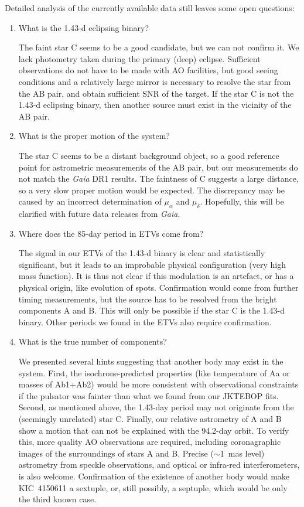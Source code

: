 \documentclass{aa}
\begin{document}
Detailed analysis of the currently available data still leaves some open questions:
\begin{enumerate}
\item What is the 1.43-d eclipsing binary?

The faint star C seems to be a good candidate, but we can not confirm it. We lack 
photometry taken during the primary (deep) eclipse. Sufficient observations do not 
have to be made with AO facilities, but good seeing conditions and a relatively large
mirror is necessary to resolve the star from the AB pair, and obtain sufficient 
SNR of the target. If the star C is not the 1.43-d eclipsing binary, then another 
source must exist in the vicinity of the AB pair.

\item What is the proper motion of the system?

The star C seems to be a distant background object, so a good reference point for 
astrometric measurements of the AB pair, but our measurements do not match the
{\it Gaia} DR1 results. The faintness of C suggests a large distance, so a very
slow proper motion would be expected. The discrepancy may be caused by an 
incorrect determination of $\mu_\alpha$ and $\mu_\delta$. Hopefully, this will
be clarified with future data releases from {\it Gaia}.

\item Where does the 85-day period in ETVs come from?

The signal in our ETVs of the 1.43-d binary is clear and statistically significant,
but it leads to an improbable physical configuration (very high mass function). 
It is thus not clear if this modulation is an artefact, or has a physical origin, like
evolution of spots. Confirmation would come from further timing measurements, but the
source has to be resolved from the bright components A and B. This will only be possible
if the star C is the 1.43-d binary. Other periods we found in the ETVs also require 
confirmation.

\item What is the true number of components?

We presented several hints suggesting that another body may exist in the system. 
First, the isochrone-predicted properties (like temperature of Aa or masses of 
Ab1+Ab2) would be more consistent with observational constraints if the 
pulsator was fainter than what we found from our JKTEBOP fits. Second, as mentioned 
above, the 1.43-day period may not originate from the (seemingly unrelated) star C.
Finally, our relative astrometry of A and B show a motion that can not be explained 
with the 94.2-day orbit. To verify this, more quality AO observations are required, 
including coronagraphic images of the surroundings of stars A and B. Precise 
($\sim$1~mas level) astrometry from speckle observations, and optical or infra-red 
interferometers, is also welcome. Confirmation of the existence of another body 
would make KIC~4150611 a sextuple, or, still possibly, a septuple, which would be 
only the third known case.
\end{enumerate}
\end{document}
